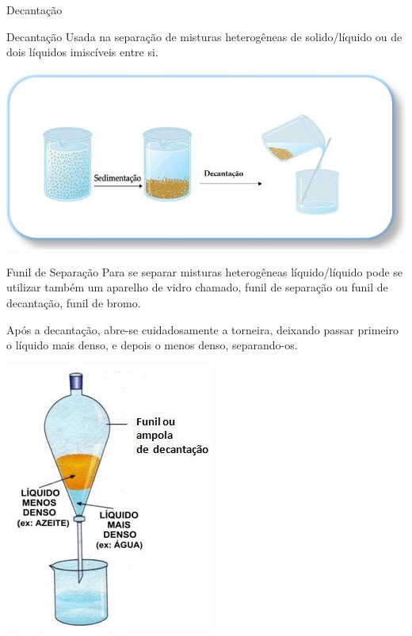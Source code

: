 \documentclass{beamer}
\begin{document}
\begin{frame}[label={sec:orgc09ae4c}]{Decantação}
\begin{block}{Decantação}
Usada na separação de misturas heterogêneas de solido/líquido ou de dois líquidos imiscíveis entre si.


\begin{center}
\includegraphics[width=.9\linewidth]{../img/decantacao.jpg}
\end{center}
\end{block}
\begin{block}{Funil de Separação}
Para se separar misturas heterogêneas líquido/líquido pode se utilizar também um aparelho de vidro chamado, funil de separação ou funil de decantação, funil de bromo. 

Após a decantação, abre-se cuidadosamente a torneira, deixando passar primeiro o líquido mais denso, e depois o menos denso, separando-os.

\begin{center}
\includegraphics[scale=0.5]{../img/decantação.jpg}
\end{center}
\end{block}
\end{frame}
\end{document}
